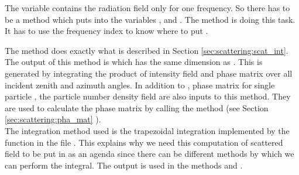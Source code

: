 The variable  contains the radiation field only
for one frequency. So there has to be a method which puts
 into the variables ,
 and . The method
 is doing this task.
It has to use the frequency index to know where
to put .
 

\label{sec:scattering:sca_fieldCalc}
The method  does exactly what is
described in Section 
\ref{sec:scattering:scat_int}.  The output of this method is
 which has the same dimension as
.  This is generated by integrating the product of
intensity field  and phase matrix
 over all incident zenith and azimuth angles.  In
addition to , phase matrix for single 
particle , the particle number density field
 are also inputs to this method.  They are used
to calculate the phase matrix  by calling the
method (see Section
\ref{sec:scattering:pha_mat} ). \\ 
The integration method used is the trapezoidal integration implemented
by the function  in the file
.  This explains why we need this
computation of scattered field to be
put in as an agenda since there can be different methods by which we
can perform the integral. 
The output  is used in the
methods  and .

\label{sec:scattering:RT_methods}

